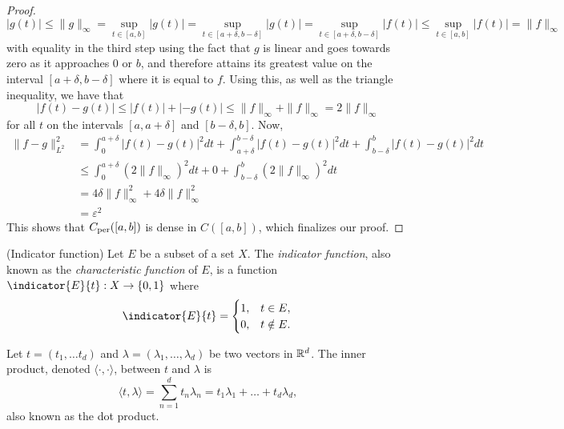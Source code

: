 \documentclass[../thesis.tex]{subfiles}
\begin{document}
\begin{proof}
    \begin{equation*}
        |g(t)| \leq \|g\|_{\infty} = \sup_{t\in[a,b]} |g(t)| = \sup_{t\in[a+\delta, b-\delta]} |g(t)| = \sup_{t\in[a+\delta, b-\delta]} |f(t)| \leq \sup_{t\in[a, b]} |f(t)| =\| f\|_{\infty}
    \end{equation*}
    with equality in the third step using the fact that $g$ is linear and goes towards zero as it approaches $0$ or $b$, and therefore attains its greatest value on the interval $[a+\delta,b-\delta]$ where it is equal to $f$. Using this, as well as the triangle inequality, we have that
    \begin{equation*}
        \left|f(t)-g(t) \right| \leq |f(t)| + |-g(t)| \leq \|f \|_{\infty} + \|f \|_{\infty} = 2 \|f \|_{\infty}
    \end{equation*}
    for all $t$ on the intervals $[a, a+\delta]$ and $[b-\delta,b]$. Now,
    \begin{align*}
        \| f-g \|_{L^2}^2 &=  \int_0^{a+\delta} \left|f(t)-g(t) \right|^2dt + \int_{a+\delta}^{b-\delta} \left|f(t)-g(t) \right|^2dt +\int_{b-\delta}^{b} \left|f(t)-g(t) \right|^2dt\\ 
        &\leq \int_0^{a+\delta} (2 \| f\|_\infty)^2dt + 0 +\int_{b-\delta}^{b} (2 \| f\|_\infty)^2dt\\
        &=  4 \delta \| f\|_\infty^2 + 4 \delta \| f\|_\infty^2\\ 
        &= \varepsilon^2
    \end{align*}
    This shows that $C_{\text{per}}([a,b])$ is dense in $C([a,b])$, which finalizes our proof.
\end{proof}

\begin{definition}(Indicator function)\label{def:indicator}
    Let $E$ be a subset of a set $X$. The \emph{indicator function}, also known as the \emph{characteristic function} of $E$, is a function $\indicator{E}{t}: X \rightarrow \braq{0,1}$ where
    \begin{equation*}
        \indicator{E}{t}  = 
        \begin{cases} 
            1, &  t\in E,\\
            0, &  t \notin E.
        \end{cases}
        \qedhere
    \end{equation*}
\end{definition}


\begin{definition}\label{def:dot_prod}
    Let $t=(t_1,\dots t_d)$ and $\lambda=(\lambda_1, \dots, \lambda_d)$ be two vectors in $\mathbb{R}^d$. The inner product, denoted $\langle \cdot, \cdot \rangle$, between $t$ and $\lambda$ is
    \begin{equation*}
        \langle t, \lambda \rangle = \sum_{n=1}^d t_n \lambda_n = t_1\lambda_1 + \dots + t_d\lambda_d,
    \end{equation*}
    also known as the dot product. 
\end{definition}
\end{document}
